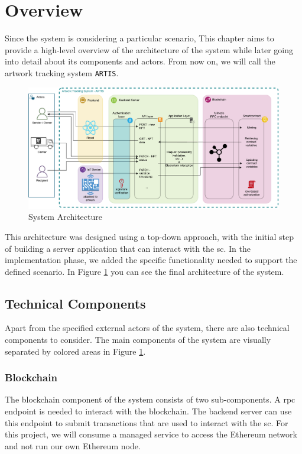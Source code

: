 \section{Overview}
\label{sec:overview}
Since the system is considering a particular scenario, This chapter aims to provide a high-level overview of the architecture of the system while later going into detail about its components and actors. From now on, we will call the artwork tracking system \texttt{ARTIS}.

\begin{figure}[ht]
    \centering
    \includegraphics[width=\textwidth, keepaspectratio]{diagrams/architecture.drawio.pdf}
    \caption{System Architecture}
    \label{fig:architecture}
\end{figure}


This architecture was designed using a top-down approach, with the initial step of building a server application that can interact with the \gls{sc}. In the implementation phase, we added the specific functionality needed to support the defined scenario. In Figure \ref{fig:architecture} you can see the final architecture of the system. 

\subsection{Technical Components}
Apart from the specified external actors of the system, there are also technical components to consider. The main components of the system are visually separated by colored areas in Figure \ref{fig:architecture}.

\subsubsection{Blockchain}
The blockchain component of the system consists of two sub-components. A \gls{rpc} endpoint is needed to interact with the blockchain. The backend server can use this endpoint to submit transactions that are used to interact with the \gls{sc}. For this project, we will consume a managed service to access the Ethereum network and not run our own Ethereum node.

